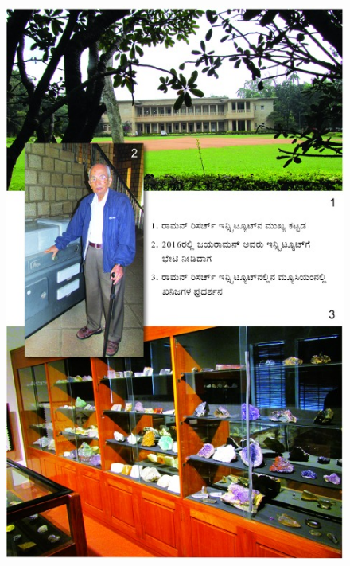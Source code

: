 \begin{figure}[!htpb]
\centering
\includegraphics[scale=2.15]{"images/001.jpg"}
\end{figure}

\vfill






